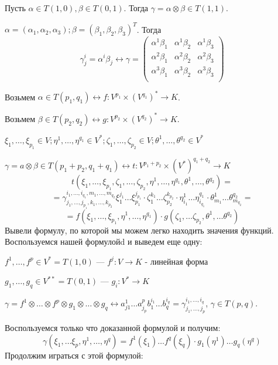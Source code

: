 Пусть $\alpha \in T(1,0), \beta \in T(0,1)$. Тогда $\gamma = \alpha \otimes \beta  \in T(1,1)$.

$\alpha = (\alpha_1,\alpha_2,\alpha_3); \beta =(\beta_1,\beta_2,\beta_3)^T$. Тогда
$$\gamma^i_j =\alpha^i\beta_j \leftrightarrow \gamma = \begin{pmatrix}
    \alpha^1\beta_1 &\alpha^1\beta_2 & \alpha^1 \beta_3 \\
    \alpha^2\beta_1 &\alpha^2\beta_2 & \alpha^2 \beta_3 \\
     \alpha^3\beta_1 &\alpha^3\beta_2 & \alpha^3 \beta_3 \\
\end{pmatrix}$$



Возьмем $\alpha \in T(p_1,q_1) \leftrightarrow f: V^{p_1}\times(V^{q_1})^* \rightarrow K$. 

Возьмем $\beta \in T(p_2,q_2) \leftrightarrow g: V^{p_2}\times(V^{q_2})^* \rightarrow K$.

$\xi_1,\ldots, \xi_{p_1} \in V;\eta^1,\ldots, \eta^{q_1}\in V^*;\zeta_1,\ldots, \zeta_{p_2}\in V; \theta^1,\ldots, \theta^{q_2}\in V^*$

$\gamma = a \otimes \beta \in T(p_1+p_2, q_1+q_1)\leftrightarrow t: V^{p_1+p_2}\times (V^*)^{q_1+q_2}\rightarrow K$
$$t(\xi_1,\ldots,\xi_{p_1},\zeta_1,\ldots,\zeta_{p_2}, \eta^1,\ldots, \eta^{q_1},\theta^1,\ldots, \theta^{q_2}) =$$$$= \gamma_{j_1,\ldots,j_{p_1},k_1,\ldots,k_{p_2}}^{i_1,\ldots,i_{q_1},m_1,\ldots,m_{q_2}} \xi_1^{j_1}\ldots \xi_{p_1}^{j_{p_1}}\cdot \zeta_1^{k_1}\ldots \zeta_{p_2}^{k_{p_2}} \cdot \eta^1_{i_1}\ldots \eta_{i_{q_1}}^{q_1} \cdot \theta_{m_1}^1 \ldots \theta^{q_2}_{m_{q_2}} = $$
$$=f(\xi_1,\ldots, \xi_{p_1},\eta^1,\ldots, \eta^{q_1})\cdot g(\zeta_1,\ldots \zeta_{p_2}, \theta^1,\ldots \theta^{q_2}) $$
Вывели формулу, по которой мы можем легко находить значения функций. Воспользуемся нашей формулойd и выведем еще одну:

$f^1,\ldots , f^p \in V^* = T(1,0)$ --- $f^j:V\rightarrow K$  - линейная форма

$g_1,\ldots,g_q\in V^{**} = T(0,1)$ --- $g_i:V^*\rightarrow K$

$\gamma = f^1\otimes \ldots \otimes f^p \otimes g_1 \otimes \ldots \otimes g_q \leftrightarrow a^1_{j1}\ldots a^{p}_{j_p}b_1^{i_1}\ldots b_q^{i_q}= \gamma^{i_1,\ldots, i_q}_{j_1,\ldots, j_p}$, $\gamma \in T(p,q)$.

Воспользуемся только что доказанной формулой и получим:
$$\gamma(\xi_1,\ldots \xi_p, \eta^1,\ldots, \eta^q)= f^1(\xi_1)\ldots f^q(\xi_q)\cdot g_1(\eta^1)\ldots g_q(\eta^q)$$
Продолжим играться с этой формулой:

